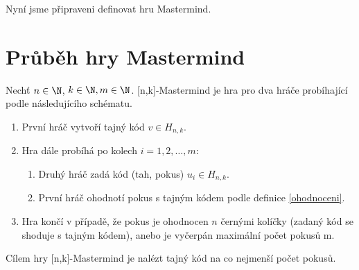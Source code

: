     







Nyní jsme připraveni definovat hru Mastermind. 

\section{Průběh hry Mastermind}
Nechť $n \in \N $, $k \in \N, m\in \N$. [n,k]-Mastermind je hra pro dva hráče 
probíhající podle následujícího schématu. 
\begin{enumerate}
    \item První hráč vytvoří tajný kód $v \in H_{n,k}$.
    \item Hra dále probíhá po kolech $i = 1,2,\dots,m$:
        \begin{enumerate}
            \item Druhý hráč zadá kód (tah, pokus) $u_i \in H_{n,k}$.
            \item První hráč ohodnotí pokus s tajným kódem podle definice \ref{ohodnoceni}.
        \end{enumerate}
    \item Hra končí v případě, že pokus je ohodnocen $n$ černými kolíčky (zadaný kód se shoduje s tajným kódem), anebo je vyčerpán maximální počet pokusů m.
\end{enumerate}
Cílem hry [n,k]-Mastermind je nalézt tajný kód na co nejmenší počet pokusů. 

